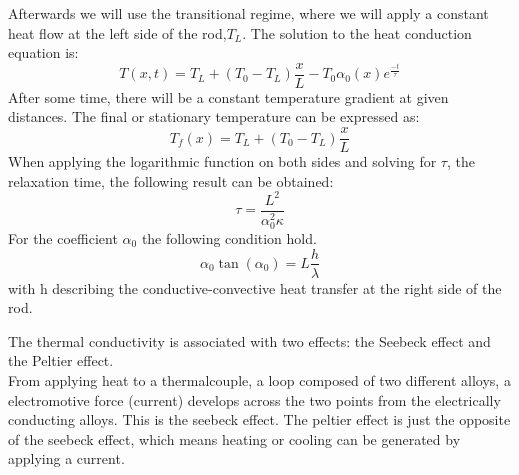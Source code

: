 \documentclass{scrartcl}
\begin{document}
Afterwards we will use the transitional regime, where we will apply a constant heat flow at the left side of the rod,$T_L$. The solution to the heat conduction equation is:
\begin{equation}
    T(x,t) = T_L+(T_0-T_L)\frac{x}{L}-T_0\alpha_0(x)e^{\frac{-t}{\tau}}
\end{equation}
After some time, there will be a constant temperature gradient at given distances. The final or stationary temperature can be expressed as:
\begin{equation}
    T_f(x) = T_L + (T_0-T_L)\frac{x}{L}
\end{equation}
When applying the logarithmic function on both sides and solving for $\tau$, the relaxation time, the following result can be obtained:
\begin{equation}
    \tau = \frac{L^2}{\alpha_0^2\kappa}
\end{equation}
For the coefficient $\alpha_0$ the following condition hold.
\begin{equation}
    \alpha_0\tan(\alpha_0) = L\frac{h}{\lambda}
\end{equation}
with h describing the  conductive-convective heat transfer at the right side of the rod. \vspace{0.5cm}

The thermal conductivity is associated with two effects: the Seebeck effect and the Peltier effect. \\
From applying heat to a thermalcouple, a loop composed of two different alloys, a electromotive force (current) develops across the two points from the electrically conducting alloys. This is the seebeck effect. The peltier effect is just the opposite of the seebeck effect, which means heating or cooling can be generated by applying a current.
\end{document}
